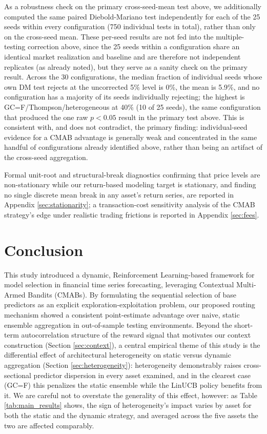 \documentclass[pdflatex,sn-mathphys-num]{sn-jnl}
\theoremstyle{thmstyleone}%
\theoremstyle{thmstyletwo}%
\theoremstyle{thmstylethree}%
\begin{document}
As a robustness check on the primary cross-seed-mean test above, we additionally computed the same paired Diebold-Mariano test independently for each of the 25 seeds within every configuration (750 individual tests in total), rather than only on the cross-seed mean. These per-seed results are not fed into the multiple-testing correction above, since the 25 seeds within a configuration share an identical market realization and baseline and are therefore not independent replicates (as already noted), but they serve as a sanity check on the primary result. Across the 30 configurations, the median fraction of individual seeds whose own DM test rejects at the uncorrected 5\% level is 0\%, the mean is 5.9\%, and no configuration has a majority of its seeds individually rejecting; the highest is GC=F/Thompson/heterogeneous at 40\% (10 of 25 seeds), the same configuration that produced the one raw $p<0.05$ result in the primary test above. This is consistent with, and does not contradict, the primary finding: individual-seed evidence for a CMAB advantage is generally weak and concentrated in the same handful of configurations already identified above, rather than being an artifact of the cross-seed aggregation.

Formal unit-root and structural-break diagnostics confirming that price levels are non-stationary while our return-based modeling target is stationary, and finding no single discrete mean break in any asset's return series, are reported in Appendix \ref{sec:stationarity}; a transaction-cost sensitivity analysis of the CMAB strategy's edge under realistic trading frictions is reported in Appendix \ref{sec:fees}.

\section{Conclusion}
\label{sec:conclusion}

This study introduced a dynamic, Reinforcement Learning-based framework for model selection in financial time series forecasting, leveraging Contextual Multi-Armed Bandits (CMABs). By formulating the sequential selection of base predictors as an explicit exploration-exploitation problem, our proposed routing mechanism showed a consistent point-estimate advantage over naive, static ensemble aggregation in out-of-sample testing environments. Beyond the short-term autocorrelation structure of the reward signal that motivates our context construction (Section \ref{sec:context}), a central empirical theme of this study is the differential effect of architectural heterogeneity on static versus dynamic aggregation (Section \ref{sec:heterogeneity}): heterogeneity demonstrably raises cross-sectional predictor dispersion in every asset examined, and in the clearest case (GC=F) this penalizes the static ensemble while the LinUCB policy benefits from it. We are careful not to overstate the generality of this effect, however: as Table \ref{tab:main_results} shows, the sign of heterogeneity's impact varies by asset for both the static and the dynamic strategy, and averaged across the five assets the two are affected comparably.
\end{document}
